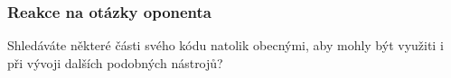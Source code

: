 \documentclass{beamer}
\begin{document}

\begin{frame}

\frametitle{Reakce na otázky oponenta}

Shledáváte některé části svého kódu natolik obecnými, aby mohly být využiti i při vývoji dalších podobných nástrojů?

\begin{center}
	\noindent\makebox[\linewidth]{\rule{0.9\textwidth}{0.4pt}}
\end{center}

\bigskip


\end{frame}

\end{document}
